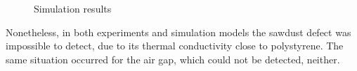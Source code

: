 \documentclass{tQRT2e}
\begin{document}
\begin{figure}
    \hspace{-20pt}
    \hspace{-5pt}
	\caption{Simulation results}
	\label{sim_res}
\end{figure}
Nonetheless, in both experiments and simulation models the sawdust defect was impossible to detect, due to its thermal conductivity close to polystyrene. The same situation occurred for the air gap, which could not be detected, neither.  
\end{document}
